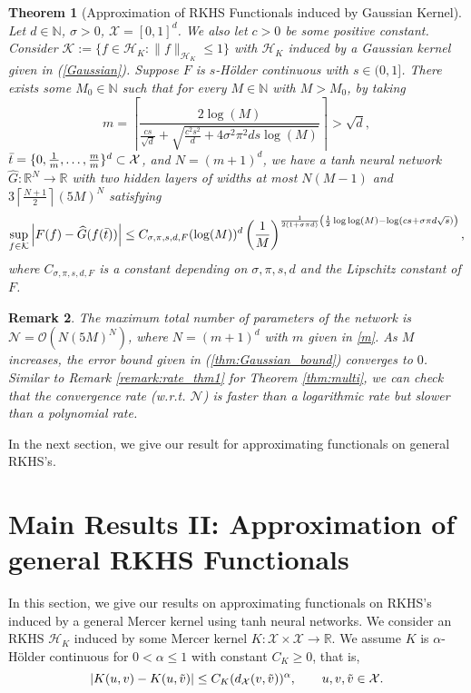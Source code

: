 \documentclass{article}
\def\NN{\mathbb N}
\def\RR{\mathbb R}
\numberwithin{equation}{section}
\newtheorem{theorem}{Theorem}[section]
\newtheorem{remark}[theorem]{Remark}
\begin{document}
\begin{theorem}[Approximation of RKHS Functionals induced by Gaussian Kernel]\label{thm:Gaussian}
Let $d\in \NN$, $\sigma >0$, $\mathcal{X} = [0,1]^d$. We also let $c>0$ be some positive constant. 
Consider $
    \mathcal{K} := \{f\in \mathcal{H}_K: \|f\|_{\mathcal{H}_K} \leq 1\}
$ with $\mathcal{H}_K$ induced by a Gaussian kernel given in (\ref{Gaussian}). 
Suppose $F$ is  $s$-H\"{o}lder continuous with $s \in (0,1]$. 
There exists some $M_0\in \NN$ such that for every $M\in \NN$ with $M>M_0$, by taking
\begin{equation}\label{m}
        m = \left\lceil \frac{2 \log(M)}{\frac{cs}{\sqrt{d}} + \sqrt{\frac{c^2s^2}{d}+4\sigma^2\pi^2ds \log(M)}}\right \rceil > \sqrt{d},
    \end{equation} 
$\Bar{t}=\{0, \frac{1}{m},\ldots, \frac{m}{m}\}^d \subset \mathcal{X}$, and $N= (m+1)^d$, we have a tanh neural network $\widehat{G}: \RR^N \to \RR$ with two hidden layers of widths at most $N(M-1)$ and $3\left\lceil\frac{N+1}{2}\right\rceil (5M)^N$ satisfying 
\begin{equation}\label{thm:Gaussian_bound}
    \sup_{f\in \mathcal{K}}\left|F(f) - \widehat{G}(f(\Bar{t}))\right|\leq C_{\sigma, \pi, s, d, F} (\log (M))^{d}\left(\frac{1}{M}\right)^{\frac{1}{2(1+ \sigma \pi d)}
    \left(\frac{1}{2}\log\log(M) - \log(cs+ \sigma \pi d\sqrt{s})\right)},
\end{equation}
where $C_{\sigma, \pi, s, d, F}$ is a constant depending on $\sigma, \pi, s, d$ and the Lipschitz constant of $F$.
\end{theorem}

\begin{remark}
The maximum total number of parameters of the network is $\mathcal{N}=  \mathcal{O}\left(N(5M)^N\right)$, where $N= (m+1)^d$ with $m$ given in \eqref{m}.  
As $M$ increases, the error bound given in (\ref{thm:Gaussian_bound}) converges to $0$. 
Similar to Remark \ref{remark:rate_thm1} for Theorem \ref{thm:multi}, we can check that the convergence rate (w.r.t. $\mathcal{N}$) is faster than a logarithmic rate but slower than a polynomial rate. 
\end{remark}


In the next section, we give our result for approximating functionals on general RKHS's.

\section{Main Results II: Approximation of general RKHS Functionals}\label{sec:mainresultII}
In this section, we give our results on approximating functionals on RKHS's induced by a general Mercer kernel using tanh neural networks. 
We consider an RKHS $\mathcal{H}_K$ induced by some Mercer kernel $K: \mathcal{X} \times \mathcal{X}  \rightarrow \RR$. 
We assume $K$ is $\alpha$-H\"{o}lder continuous for $0<\alpha \leq 1$ with constant $C_K \geq 0$,  that is, 
\begin{equation}\label{reg_K}
    |K(u,v)-K(u,\Tilde{v})| \leq C_K (d_\mathcal{X}(v,\Tilde{v}))^\alpha , \qquad  u,v,\Tilde{v} \in \mathcal{X}.
\end{equation}
\end{document}
